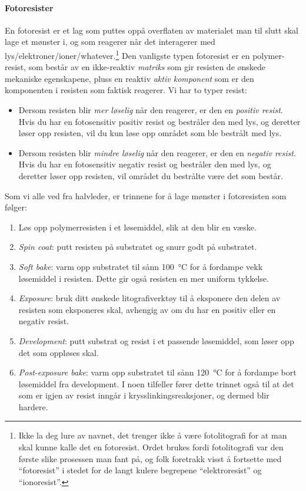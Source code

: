 \paragraph{Fotoresister} En fotoresist er et lag som puttes oppå overflaten av materialet man til slutt skal lage et mønster i, og som reagerer når det interagerer med lys/elektroner/ioner/whatever.\footnote{Ikke la deg lure av navnet, det trenger ikke å være fotolitografi for at man skal kunne kalle det en fotoresist. Ordet brukes fordi fotolitografi var den første slike prosessen man fant på, og folk foretrakk visst å fortsette med ``fotoresist'' i stedet for de langt kulere begrepene ``elektroresist'' og ``ionoresist''.} Den vanligste typen fotoresist er en polymer-resist, som består av en ikke-reaktiv \emph{matriks} som gir resisten de ønskede mekaniske egenskapene, pluss en reaktiv \emph{aktiv komponent} som er den komponenten i resisten som faktisk reagerer. Vi har to typer resist:
\begin{itemize}
	\item Dersom resisten blir \emph{mer løselig} når den reagerer, er den en \emph{positiv resist}. Hvis du har en fotosensitiv positiv resist og bestråler den med lys, og deretter løser opp resisten, vil du kun løse opp området som ble bestrålt med lys.
	\item Dersom resisten blir \emph{mindre løselig} når den reagerer, er den en \emph{negativ resist}. Hvis du har en fotosensitiv negativ resist og bestråler den med lys, og deretter løser opp resisten, vil området du bestrålte være det som består.
\end{itemize}
Som vi alle ved fra halvleder, er trinnene for å lage mønster i fotoresisten som følger: 
\begin{enumerate}
	\item Løs opp polymerresisten i et løsemiddel, slik at den blir en væske.
	\item \emph{Spin coat}: putt resisten på substratet og snurr godt på substratet.
	\item \emph{Soft bake}: varm opp substratet til sånn \SI{100}{\celsius} for å fordampe vekk løsemiddel i resisten. Dette gir også resisten en mer uniform tykkelse.
	\item \emph{Exposure}: bruk ditt ønskede litografiverktøy til å eksponere den delen av resisten som eksponeres skal, avhengig av om du har en positiv eller en negativ resist.
	\item \emph{Development}: putt substrat og resist i et passende løsemiddel, som løser opp det som oppløses skal.
	\item \emph{Post-exposure bake}: varm opp substratet til sånn \SI{120}{\celsius} for å fordampe bort løsemiddel fra development. I noen tilfeller fører dette trinnet også til at det som er igjen av resist inngår i krysslinkingsreaksjoner, og dermed blir hardere.
\end{enumerate}

